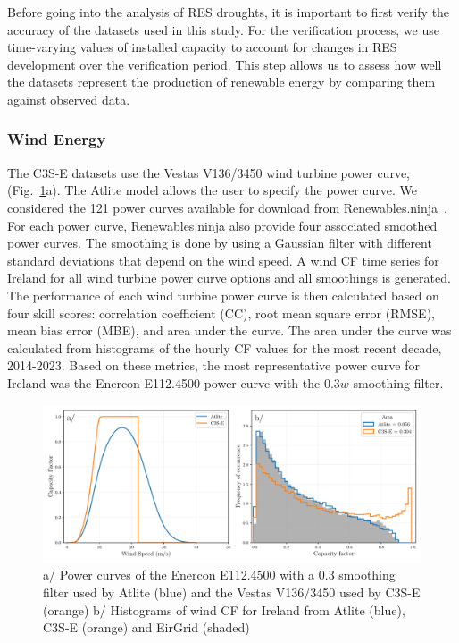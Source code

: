 \documentclass[a4paper, 11pt]{article}
\begin{document}
Before going into the analysis of RES droughts, it is important to first verify the accuracy of the datasets used in this study. For the verification process, we use time-varying values of installed capacity to account for changes in RES development over the verification period. This step allows us to assess how well the datasets represent the production of renewable energy by comparing them against observed data.
	
\subsubsection{Wind Energy}
\label{sec:wind_verification}

The C3S-E datasets use the Vestas V136/3450 wind turbine power curve, (Fig.~\ref{fig:power_curve}a). The Atlite model allows the user to specify the power curve. We considered the 121 power curves available for download from Renewables.ninja~\cite{staffell2016wake}. For each power curve, Renewables.ninja also provide four associated smoothed power curves. The smoothing is done by using a Gaussian filter with different standard deviations that depend on the wind speed. A wind CF time series for Ireland for all wind turbine power curve options and all smoothings is generated. The performance of each wind turbine power curve is then calculated based on four skill scores: correlation coefficient (CC), root mean square error (RMSE), mean bias error (MBE), and area under the curve. The area under the curve was calculated from histograms of the hourly CF values for the most recent decade, 2014-2023. Based on these metrics, the most representative power curve for Ireland was the Enercon E112.4500 power curve with the $0.3w$  smoothing filter.

\begin{figure}[!ht]
	\centering
	\includegraphics[width=\textwidth]{power_curve}
	\caption{a/ Power curves of the Enercon E112.4500 with a 0.3 smoothing filter used by Atlite (blue) and the Vestas V136/3450 used by C3S-E (orange) b/ Histograms of wind CF for Ireland from Atlite (blue), C3S-E (orange) and EirGrid (shaded)}
	\label{fig:power_curve}
\end{figure}
\end{document}
